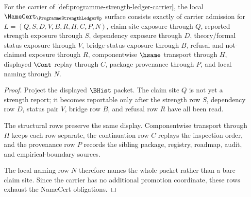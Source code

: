 \begin{theorem}
\label{thm:programme-strength-ledger-namecert-obligations}
For the carrier of \autoref{def:programme-strength-ledger-carrier}, the local $\NameCert_{\ProgrammeStrengthLedgerUp}$ surface consists exactly of carrier admission for $L=(Q,S,D,V,B,R,H,C,P,N)$, claim-site exposure through $Q$, reported-strength exposure through $S$, dependency exposure through $D$, theory/formal status exposure through $V$, bridge-status exposure through $B$, refusal and not-claimed exposure through $R$, componentwise $\hsame$ transport through $H$, displayed $\Cont$ replay through $C$, package provenance through $P$, and local naming through $N$.
\end{theorem}
\begin{proof}
Project the displayed $\BHist$ packet. The claim site $Q$ is not yet a strength report; it becomes reportable only after the strength row $S$, dependency row $D$, status pair $V$, bridge row $B$, and refusal row $R$ have all been read.

The structural rows preserve the same display. Componentwise transport through $H$ keeps each row separate, the continuation row $C$ replays the inspection order, and the provenance row $P$ records the sibling package, registry, roadmap, audit, and empirical-boundary sources.

The local naming row $N$ therefore names the whole packet rather than a bare claim site. Since the carrier has no additional promotion coordinate, these rows exhaust the NameCert obligations.
\end{proof}


